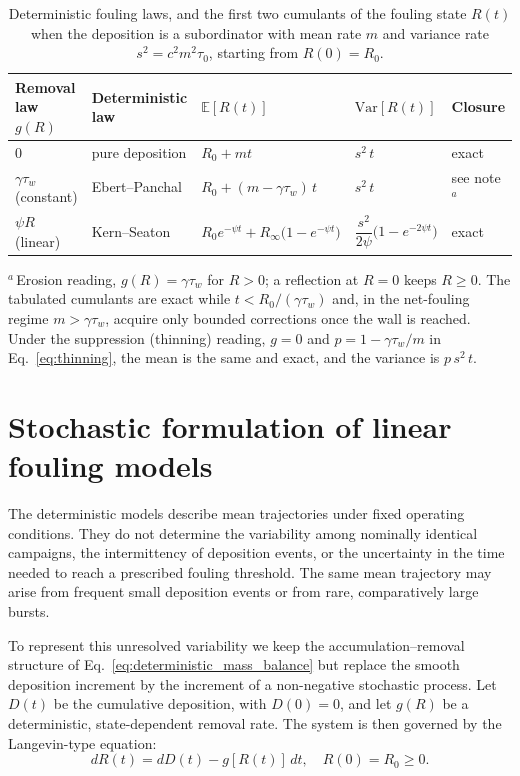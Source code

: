 \documentclass[preprint,12pt]{elsarticle}
\begin{document}
\begin{table}[tb]
\caption{Deterministic fouling laws, and the
first two cumulants of the fouling state $R(t)$ when the deposition is a
subordinator with mean rate $m$ and variance rate $s^2=c^2m^2\tau_0$, starting
from $R(0)=R_0$.}
\label{tab:removal}
\small
\begin{tabular}{lllll}
\toprule
Removal law $g(R)$ & Deterministic law &  $\mathbb E[R(t)]$ &  $\mathrm{Var}[R(t)]$ & Closure \\
\midrule
$0$ & pure deposition & $R_0+mt$ & $s^2\,t$ & exact \\
$\gamma\tau_w$ (constant) & Ebert--Panchal & $R_0+(m-\gamma\tau_w)\,t$ & $s^2\,t$ & see note$^{a}$ \\
$\psi R$ (linear) & Kern--Seaton & $R_0e^{-\psi t}+R_\infty\bigl(1-e^{-\psi t}\bigr)$ & $\dfrac{s^2}{2\psi}\bigl(1-e^{-2\psi t}\bigr)$ & exact \\
\bottomrule
\end{tabular}

\vspace{3pt}\footnotesize\noindent$^{a}$\,Erosion reading, $g(R)=\gamma\tau_w$ for $R>0$; a
reflection at $R=0$ keeps $R\ge0$. The tabulated cumulants are exact while
$t<R_0/(\gamma\tau_w)$ and, in the net-fouling regime $m>\gamma\tau_w$,
acquire only bounded corrections once the wall is reached. Under the
suppression (thinning) reading, $g=0$ and $p=1-\gamma\tau_w/m$ in
Eq.~\eqref{eq:thinning}, the mean is the same and exact, and the variance is
$p\,s^2\,t$.
\end{table}

\section{Stochastic formulation of linear fouling models}
\label{sec:stochastic_formulation}

The deterministic models describe mean trajectories under fixed operating
conditions. They do not determine the variability among nominally identical
campaigns, the intermittency of deposition events, or the uncertainty in the
time needed to reach a prescribed fouling threshold. The same mean
trajectory may arise from frequent small deposition events or from rare,
comparatively large bursts.

To represent this unresolved variability we keep the accumulation--removal
structure of Eq.~\eqref{eq:deterministic_mass_balance} but replace the
smooth deposition increment by the increment of a non-negative stochastic
process. Let $D(t)$ be the cumulative deposition, with $D(0)=0$, and let
$g(R)$ be a deterministic, state-dependent removal rate. The system is then governed by the Langevin-type equation:
\begin{equation}
  dR(t)=dD(t)-g[R(t)]\,dt,\quad R(0)=R_0\ge0 .
  \label{eq:stochastic_balance}
\end{equation}
\end{document}
